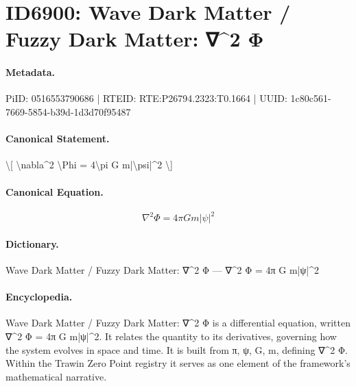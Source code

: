 \section*{ID6900: Wave Dark Matter / Fuzzy Dark Matter: ∇\textasciicircum{}2 Φ}
\paragraph{Metadata.}
PiID: 0516553790686 | RTEID: RTE:P26794.2323:T0.1664 | UUID: 1c80c561-7669-5854-b39d-1d3d70f95487

\paragraph{Canonical Statement.}
\textbackslash{}[ \textbackslash{}nabla\textasciicircum{}2 \textbackslash{}Phi = 4\textbackslash{}pi G m|\textbackslash{}psi|\textasciicircum{}2 \textbackslash{}]

\paragraph{Canonical Equation.}
\[
\nabla^2 \Phi = 4\pi G m|\psi|^2
\]

\paragraph{Dictionary.}
Wave Dark Matter / Fuzzy Dark Matter: ∇\textasciicircum{}2 Φ — ∇\textasciicircum{}2 Φ = 4π G m|ψ|\textasciicircum{}2

\paragraph{Encyclopedia.}
Wave Dark Matter / Fuzzy Dark Matter: ∇\textasciicircum{}2 Φ is a differential equation, written ∇\textasciicircum{}2 Φ = 4π G m|ψ|\textasciicircum{}2. It relates the quantity to its derivatives, governing how the system evolves in space and time. It is built from π, ψ, G, m, defining ∇\textasciicircum{}2 Φ. Within the Trawin Zero Point registry it serves as one element of the framework's mathematical narrative.
